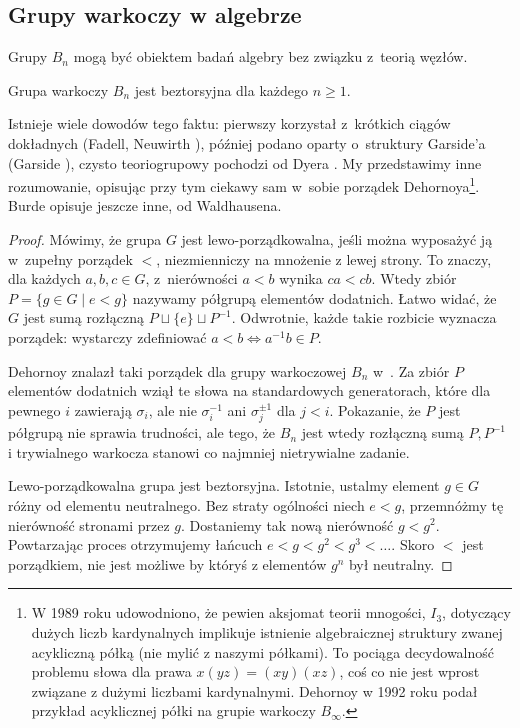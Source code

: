 
\subsection{Grupy warkoczy w algebrze}
Grupy $B_n$ mogą być obiektem badań algebry bez związku z~teorią węzłów.

\begin{proposition}
    Grupa warkoczy $B_n$ jest beztorsyjna dla każdego $n \ge 1$.
\end{proposition}

Istnieje wiele dowodów tego faktu: pierwszy korzystał z~krótkich ciągów dokładnych (Fadell, Neuwirth \cite{neuwirth1962}), później podano oparty o~struktury Garside'a (Garside \cite{garside1969}), czysto teoriogrupowy pochodzi od Dyera \cite{dyer1980}.
%
%
%
%
My przedstawimy inne rozumowanie, opisując przy tym ciekawy sam w~sobie porządek Dehornoya\footnote{W 1989 roku udowodniono, że pewien aksjomat teorii mnogości, $I_3$, dotyczący dużych liczb kardynalnych implikuje istnienie algebraicznej struktury zwanej acykliczną półką (nie mylić z naszymi półkami).
To pociąga decydowalność problemu słowa dla prawa $x(yz) = (xy)(xz)$, coś co nie jest wprost związane z dużymi liczbami kardynalnymi.
Dehornoy w 1992 roku podał przykład acyklicznej półki na grupie warkoczy $B_\infty$.}.%
%
Burde \cite[s. 178]{burde1966} opisuje jeszcze inne, od Waldhausena.
%

\begin{proof}
%
    Mówimy, że grupa $G$ jest lewo-porządkowalna, jeśli można wyposażyć ją w~zupełny porządek $<$, niezmienniczy na mnożenie z lewej strony.
    To znaczy, dla każdych $a, b, c \in G$, z~nierówności $a < b$ wynika $ca < cb$.
    Wtedy zbiór $P = \{g \in G \mid e < g\}$ nazywamy półgrupą elementów dodatnich.
    Łatwo widać, że $G$ jest sumą rozłączną $P \sqcup \{e\} \sqcup P^{-1}$.
    Odwrotnie, każde takie rozbicie wyznacza porządek: wystarczy zdefiniować $a < b \iff a^{-1}b \in P$.

    Dehornoy znalazł taki porządek dla grupy warkoczowej $B_n$ w~\cite{dehornoy1994}.
    Za zbiór $P$ elementów dodatnich wziął te słowa na standardowych generatorach, które dla pewnego $i$ zawierają $\sigma_i$, ale nie $\sigma_i^{-1}$ ani $\sigma_j^{\pm 1}$ dla $j < i$.
    Pokazanie, że $P$ jest półgrupą nie sprawia trudności, ale tego, że $B_n$ jest wtedy rozłączną sumą $P, P^{-1}$ i trywialnego warkocza stanowi co najmniej nietrywialne zadanie.

    Lewo-porządkowalna grupa jest beztorsyjna.
    Istotnie, ustalmy element $g \in G$ różny od elementu neutralnego.
    Bez straty ogólności niech $e < g$, przemnóżmy tę nierówność stronami przez $g$.
    Dostaniemy tak nową nierówność $g < g^2$.
    Powtarzając proces otrzymujemy łańcuch $e < g < g^2 < g^3 < \ldots$.
    Skoro $<$ jest porządkiem, nie jest możliwe by któryś z elementów $g^n$ był neutralny.
\end{proof}

